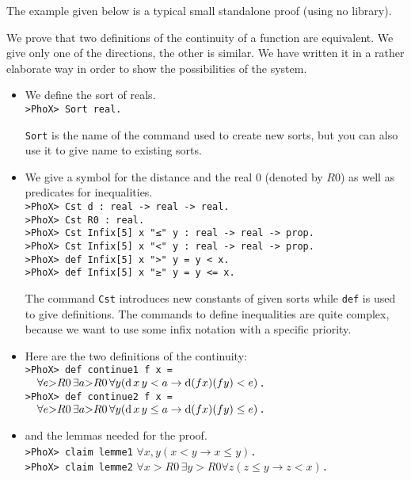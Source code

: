 The example given below is a typical small standalone proof (using no
library).

We prove that two definitions of the continuity of a function are
equivalent. We give only one of the directions, the other is
similar. We have written it in a rather elaborate way in order to show
the possibilities of the system.

\begin{itemize}
\item We define the sort of reals.  \\
\verb~>PhoX> Sort real.~

\verb~Sort~ is the name of the command used to create new sorts, but
you can also use it to give name to existing sorts.

\item We give a symbol for the distance and the real 0  (denoted by
$R0$) as well as predicates for inequalities.                         \\
\verb~>PhoX> Cst d : real -> real -> real.~                    \\
\verb~>PhoX> Cst R0 : real.~                                   \\
\verb~>PhoX> Cst Infix[5] x "≤" y : real -> real -> prop.~    \\
\verb~>PhoX> Cst Infix[5] x "<" y : real -> real -> prop.~     \\
\verb~>PhoX> def Infix[5] x ">" y = y < x.~                    \\
\verb~>PhoX> def Infix[5] x "≥" y = y <= x.~

The command \verb~Cst~ introduces new constants of given sorts while
\verb~def~ is used to give definitions. The commands to define
inequalities are quite
complex, because we want to use some infix notation with a specific
priority.

\item Here are the two definitions of the continuity:
\\\verb~>PhoX> def continue1 f x =~ \\\verb~  ~$\forall e{>}R0 \,\exists a{>}R0
\,\forall y
(\hbox{d}\,x\,y < a \rightarrow \hbox{d} (f x) (f y) < e)$\verb~.~                      \\
\verb~>PhoX> def continue2 f x =~ \\\verb~  ~$\forall e{>}R0 \,\exists a{>}R0
\,\forall y (\hbox{d}\,x\,y \leq a \rightarrow \hbox{d} (f x) (f
y) \leq e)$\verb~.~

\item and the lemmas needed for the proof. \\
\verb~>PhoX> claim lemme1~ $\forall x,y (x < y \rightarrow x \leq y)$\verb~.~ \\
\verb~>PhoX> claim lemme2~ $\forall x{>}R0 \,\exists y{>}R0 \forall z (z \leq y \rightarrow z < x)$\verb~.~


\end{itemize}
